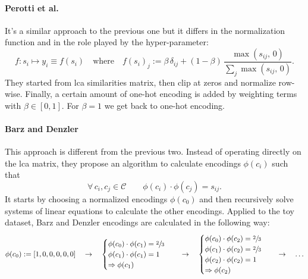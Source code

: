 \paragraph{Perotti et al.~\cite{BeyondOneHotPerott2023}}\label{par:encoding-b3p} It's a similar approach to the previous one but it differs in the normalization function and in the role played by the hyper-parameter:
\begin{equation}
  f :  s_i \mapsto y_i \equiv f(s_i)
  \quad \textrm{where} \quad
  f (s_i)_j := \beta \, \delta_{ij} +
  \left(1 - \beta \right) \, \frac{\max \left(s_{ij},\,0\right)}
  {\sum_j \max \left(s_{ij},\,0\right)}.
  \label{eq:b3p-hierarchical-encoding}
\end{equation}
They started from \acrshort{lca} similarities matrix, then clip at zeros and normalize row-wise.
Finally, a certain amount of one-hot encoding is added by weighting terms with $\beta \in [0, 1]$. For $\beta = 1$ we get back to one-hot encoding.

\paragraph{Barz and Denzler~\cite{HierarchyBasedBarz2018}}\label{par:encoding-bd} This approach is different from the previous two. Instead of operating directly on the \acrshort{lca} matrix, they propose an algorithm to calculate encodings $\phi(c_i)$ such that
\begin{equation}
  \forall \, c_i, c_j \in \mathcal{C} \qquad
  \phi(c_i) \cdot \phi(c_j) = s_{ij}.
  \label{eq:bd-hierarchical-encoding}
\end{equation}
It starts by choosing a normalized encodings $\phi(c_0)$ and then recursively solve systems of linear equations to calculate the other encodings.
Applied to the toy dataset, Barz and Denzler encodings are calculated in the following way:
\begin{equation*}
  \phi{\left(c_0\right)} := \left[1, 0, 0, 0, 0, 0\right]
  \quad \rightarrow \quad
  \begin{cases}
    \phi{\left(c_0\right)} \cdot \phi{\left(c_1\right)} = \sfrac{2}{3} \\
    \phi{\left(c_1\right)} \cdot \phi{\left(c_1\right)} = 1 \\
    \Rightarrow  \phi{\left(c_1\right)}
  \end{cases}
  \quad \rightarrow \quad
  \begin{cases}
    \phi{\left(c_0\right)} \cdot \phi{\left(c_2\right)} = \sfrac{2}{3} \\
    \phi{\left(c_1\right)} \cdot \phi{\left(c_2\right)} = \sfrac{2}{3} \\
    \phi{\left(c_2\right)} \cdot \phi{\left(c_2\right)} = 1 \\
    \Rightarrow \phi{\left(c_2\right)}
  \end{cases}
  \quad \rightarrow \quad \ldots
\end{equation*}

